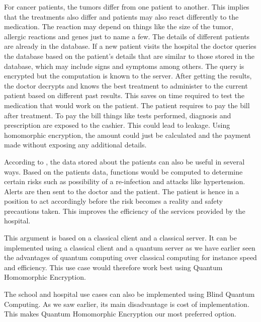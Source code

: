 For cancer patients, the tumors differ from one patient to another. This implies that the treatments  also differ and patients may also react differently to the medication. The reaction may depend on things like the size of the tumor, allergic reactions and genes just to name a few. The details of different patients are already in the database. If a new patient visits the hospital the doctor queries the database based on the patient's details that are similar to those stored in the database, which may include signs and symptoms among others.
The query is encrypted but the computation is known to the server. After getting the results, the doctor decrypts and knows the best treatment to administer to the current patient based on different past results. This saves on time required to test the medication that would work on the patient. The patient requires to pay the bill after treatment. To pay the bill things like tests performed, diagnosis and prescription are exposed to the cashier. This could lead to leakage. Using homomorphic encryption, the amount could just be calculated and the payment made without exposing any additional details.

According to \citep{naehrig2011can}, the data stored about the patients can also be useful in several ways. Based on the patients data, functions would be computed to determine certain risks such as possibility of a re-infection and attacks like hypertension. Alerts are then sent to the doctor and the patient. The patient is hence in a position to act accordingly before the risk becomes a reality and safety precautions taken. This improves the efficiency of the services provided by the hospital. 

This argument is based on a classical client and a classical server. It can be implemented using a classical client and a quantum server as we have earlier seen the advantages of quantum computing over classical computing for instance speed and efficiency. This use case would therefore work best using Quantum Homomorphic Encryption.


The school and hospital use cases can also be implemented using Blind Quantum Computing. As we saw earlier, its main disadvantage is cost of implementation. This makes Quantum Homomorphic Encryption our most preferred option.



   